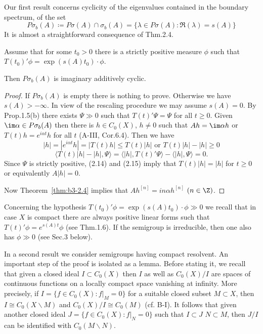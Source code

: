 Our first result concerns cyclicity of the eigenvalues contained in the boundary spectrum, \ie of the set
	\[
	P\sigma_{b}(A) \coloneqq P\sigma(A) \cap \sigma_{b}(A) = \{\lambda \in P\sigma(A) \colon \Re(\lambda) = s(A)\}
	\]
	It is almost a straightforward consequence of Thm.2.4.
	\begin{proposition}\label{prop:b3-2.7}
		
		Assume that for some $t_{0} > 0$ there is a strictly positive measure $\phi$ such that $T(t_{0})'\phi = \exp(s(A)t_{0})\cdot\phi$.
		
		Then $P\sigma_{b}(A)$ is imaginary additively cyclic.
	\end{proposition}
\begin{proof}
	If $P\sigma_{b}(A)$ is empty there is nothing to prove.
	Otherwise we have $s(A) > -\infty$.
	In view of the rescaling procedure we may assume $s(A) = 0$.
	By Prop.1.5(b) there exists $\Psi \gg 0$ such that $T(t)'\Psi = \Psi$ for all $t \geq 0$.
	Given $\im \alpha \in P\sigma_{b}(A)$ then there is $h \in C_{0}(X)$, $h \neq 0$ such that $Ah = \im\alpha h$ or $T(t)h = e^{i\alpha t}h$ for all $t$ (A-III, Cor.6.4).
%			
	Then we have
	\begin{equation}\label{eq:b3-2.14}
		|h| = |e^{i\alpha t}h| = |T(t)h| \leq T(t)|h| \text{ or } T(t)|h| - |h| \geq 0
	\end{equation}
	\begin{equation}\label{eq:b3-2.15}
		\langle T(t)|h| - |h|,\Psi \rangle = \langle |h|,T(t)'\Psi \rangle - \langle |h|,\Psi \rangle = 0.
	\end{equation}
	Since $\Psi$ is strictly positive, (2.14) and (2.15) imply that $T(t)|h| = |h|$ for $t \geq 0$ or equivalently $A|h| = 0$.
	
	Now Theorem~\ref{thm:b3-2.4} implies that $Ah^{[n]} = in\alpha h^{[n]}$ $(n \in \Z)$.
\end{proof}
Concerning the hypothesis $T(t_{0})'\phi = \exp(s(A)t_{0})\cdot\phi \gg 0$ we recall that in case $X$ is compact there are always positive linear forms such that $T(t)'\phi = e^{s(A)t}\phi$ (see Thm.1.6).
If the semigroup is irreducible, then one also has $\phi \gg 0$ (see Sec.3 below).

In a second result we consider semigroups having compact resolvent.
An important step of the proof is isolated as a lemma.
Before stating it, we recall that given a closed ideal $I \subset C_{0}(X)$ then $I$ as well as $C_{0}(X)/I$ are spaces of continuous functions on a locally compact space vanishing at infinity.
More precisely, if $I = \{f \in C_{0}(X) \colon f|_{M} = 0\}$ for a suitable closed subset $M \subset X$, then $I \cong C_{0}(X\backslash M)$ and $C_{0}(X)/I \cong C_{0}(M)$ (cf. B-I).
It follows that given another closed ideal $J = \{f \in C_{0}(X) \colon f|_{N} = 0\}$ such that $I \subset J$ \ie $N \subset M$, then $J/I$ can be identified with $C_{0}(M\backslash N)$.

